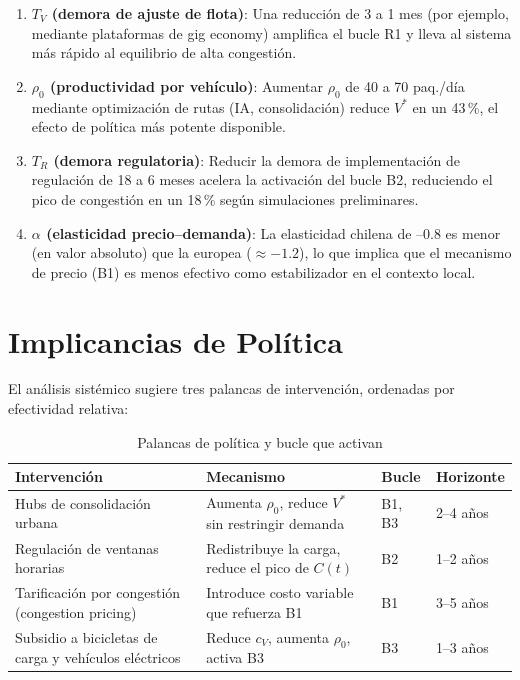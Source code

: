 \documentclass[12pt,a4paper]{article}
\begin{document}
\begin{enumerate}[leftmargin=1.5cm]
  \item \textbf{$T_V$ (demora de ajuste de flota)}: Una reducción de
    3 a 1 mes (por ejemplo, mediante plataformas de gig economy)
    amplifica el bucle R1 y lleva al sistema más rápido al equilibrio
    de alta congestión.

  \item \textbf{$\rho_0$ (productividad por vehículo)}: Aumentar
    $\rho_0$ de 40 a 70 paq./día mediante optimización de rutas
    (IA, consolidación) reduce $V^*$ en un 43\,\%, el efecto de
    política más potente disponible.

  \item \textbf{$T_R$ (demora regulatoria)}: Reducir la demora de
    implementación de regulación de 18 a 6 meses acelera la activación
    del bucle B2, reduciendo el pico de congestión en un 18\,\% según
    simulaciones preliminares.

  \item \textbf{$\alpha$ (elasticidad precio--demanda)}: La elasticidad
    chilena de --0.8 es menor (en valor absoluto) que la europea
    ($\approx -1.2$), lo que implica que el mecanismo de precio (B1)
    es menos efectivo como estabilizador en el contexto local.
\end{enumerate}

\section{Implicancias de Política}

El análisis sistémico sugiere tres palancas de intervención,
ordenadas por efectividad relativa:

\begin{table}[H]
\centering
\caption{Palancas de política y bucle que activan}
\label{tab:politica}
\begin{tabularx}{\textwidth}{@{}p{3.5cm}Xp{2.5cm}p{2cm}@{}}
\toprule
\rowcolor{azulUCH!15}
\textbf{Intervención} & \textbf{Mecanismo} & \textbf{Bucle} & \textbf{Horizonte} \\
\midrule
Hubs de consolidación urbana
  & Aumenta $\rho_0$, reduce $V^*$ sin restringir demanda
  & B1, B3 & 2--4 años \\
\midrule
Regulación de ventanas horarias
  & Redistribuye la carga, reduce el pico de $C(t)$
  & B2 & 1--2 años \\
\midrule
Tarificación por congestión (congestion pricing)
  & Introduce costo variable que refuerza B1
  & B1 & 3--5 años \\
\midrule
Subsidio a bicicletas de carga y vehículos eléctricos
  & Reduce $c_V$, aumenta $\rho_0$, activa B3
  & B3 & 1--3 años \\
\bottomrule
\end{tabularx}
\end{table}
\end{document}

